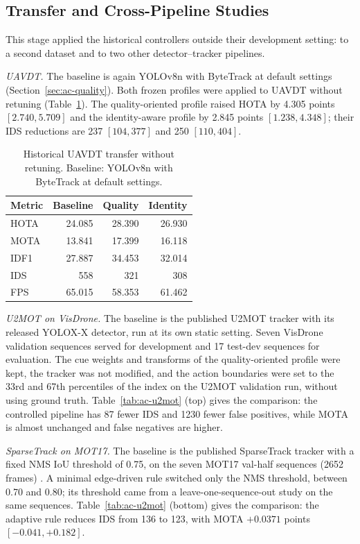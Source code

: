 \subsection{Transfer and Cross-Pipeline Studies}\label{sec:ac-transfer}
This stage applied the historical controllers outside their development setting: to a second dataset and to two other detector--tracker pipelines.

\emph{UAVDT.} The baseline is again YOLOv8n with ByteTrack at default settings (Section~\ref{sec:ac-quality}). Both frozen profiles were applied to UAVDT \cite{du2018uavdt} without retuning (Table~\ref{tab:ac-histuavdt}). The quality-oriented profile raised HOTA by 4.305 points $[2.740, 5.709]$ and the identity-aware profile by 2.845 points $[1.238, 4.348]$; their IDS reductions are 237 $[104, 377]$ and 250 $[110, 404]$.

\begin{table}[tbp]
\centering
\caption{Historical UAVDT transfer without retuning. Baseline: YOLOv8n with ByteTrack at default settings.}
\label{tab:ac-histuavdt}
\begin{tabular}{lrrr}
\toprule
Metric & Baseline & Quality & Identity\\
\midrule
HOTA & 24.085 & 28.390 & 26.930\\
MOTA & 13.841 & 17.399 & 16.118\\
IDF1 & 27.887 & 34.453 & 32.014\\
IDS & 558 & 321 & 308\\
FPS & 65.015 & 58.353 & 61.462\\
\bottomrule
\end{tabular}
\end{table}

\emph{U2MOT on VisDrone.} The baseline is the published U2MOT tracker \cite{liu2023u2mot} with its released YOLOX-X detector, run at its own static setting. Seven VisDrone validation sequences served for development and 17 test-dev sequences for evaluation. The cue weights and transforms of the quality-oriented profile were kept, the tracker was not modified, and the action boundaries were set to the 33rd and 67th percentiles of the index on the U2MOT validation run, without using ground truth. Table~\ref{tab:ac-u2mot} (top) gives the comparison: the controlled pipeline has 87 fewer IDS and 1230 fewer false positives, while MOTA is almost unchanged and false negatives are higher.

\emph{SparseTrack on MOT17.} The baseline is the published SparseTrack tracker \cite{liu2025sparsetrack} with a fixed NMS IoU threshold of 0.75, on the seven MOT17 val-half sequences (2652 frames) \cite{dendorfer2021motchallenge}. A minimal edge-driven rule switched only the NMS threshold, between 0.70 and 0.80; its threshold came from a leave-one-sequence-out study on the same sequences. Table~\ref{tab:ac-u2mot} (bottom) gives the comparison: the adaptive rule reduces IDS from 136 to 123, with MOTA $+0.0371$ points $[-0.041, +0.182]$.

